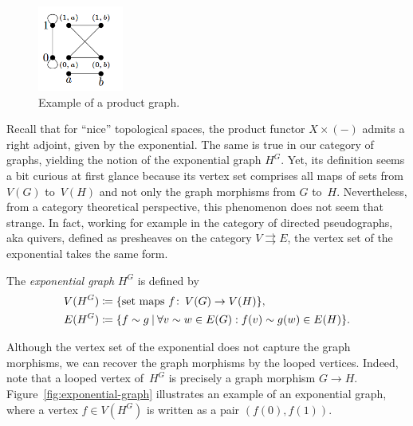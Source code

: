 \documentclass[11pt,a4paper]{article}
\begin{document}
	\begin{figure}[H]
		\centering
		\includegraphics[width=0.25\textwidth]{figures/product-graph}
		\caption{Example of a product graph.}
		\label{fig:product-graph}
	\end{figure}
	
	Recall that for ``nice'' topological spaces, the product functor $X\times(-)$ admits a right adjoint, given by the exponential. The same is true in our category of graphs, yielding the notion of the exponential graph $H^G$. Yet, its definition seems a bit curious at first glance because its vertex set comprises all maps of sets from $V(G)$ to~$V(H)$ and not only the graph morphisms from $G$ to~$H$. Nevertheless, from a category theoretical perspective, this phenomenon does not seem that strange. In fact, working for example in the category of directed pseudographs, aka quivers, defined as presheaves on the category $V\rightrightarrows E$, the vertex set of the exponential takes the same form.
	
	\begin{defi}
		The \textit{exponential graph} $H^G$ is defined by
		\begin{align*}
			V(H^G) &\coloneqq \{ \textup{set maps } f\colon\thinspace V(G)\to V(H) \}, \\
			E(H^G) &\coloneqq \{ f\sim g\mathbin| \forall v\sim w\in E(G): f(v)\sim g(w)\in E(H) \}.
		\end{align*}
	\end{defi}
	
	Although the vertex set of the exponential does not capture the graph morphisms, we can recover the graph morphisms by the looped vertices. Indeed, note that a looped vertex of~$H^G$ is precisely a graph morphism $G\to H$.
	Figure~\ref{fig:exponential-graph} illustrates an example of an exponential graph, where a vertex $f\in V(H^G)$ is written as a pair $(f(0),f(1))$.
	
\end{document}
